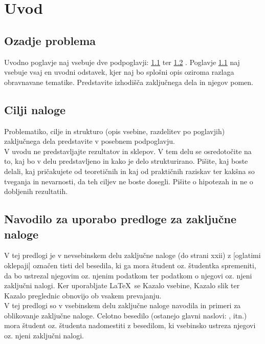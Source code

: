 \chapter{Uvod}\label{cha:uvod}

\section{Ozadje problema}\label{sec:ozadje_problema}
Uvodno poglavje naj vsebuje dve podpoglavji: \ref{sec:ozadje_problema}  ter \ref{sec:cilji_naloge} . Poglavje \ref{sec:ozadje_problema}  naj vsebuje vsaj en uvodni odstavek, kjer naj bo splošni opis oziroma razlaga obravnavane tematike. Predstavite izhodišča zaključnega dela in njegov pomen.


\section{Cilji naloge}\label{sec:cilji_naloge}
Problematiko, cilje in strukturo (opis vsebine, razdelitev po poglavjih) zaključnega dela predstavite v posebnem podpoglavju.\\

V uvodu ne predstavljajte rezultatov in sklepov. V tem delu se osredotočite na to, kaj bo v delu predstavljeno in kako je delo strukturirano. Pišite, kaj boste delali, kaj pričakujete od teoretičnih in kaj od praktičnih raziskav ter kakšna so tveganja in nevarnosti, da teh ciljev ne boste dosegli. Pišite o hipotezah in ne o dobljenih rezultatih.

\section{Navodilo za uporabo predloge za zaključne naloge}\label{sec:uporaba_predloge}
V tej predlogi je v nevsebinskem delu zaključne naloge (do strani xxii) z [oglatimi oklepaji] označen tisti del besedila, ki ga mora študent oz. študentka spremeniti, da bo ustrezal njegovim oz. njenim podatkom ter podatkom o njegovi oz. njeni zaključni nalogi. Ker uporabljate \LaTeX~se Kazalo vsebine, Kazalo slik ter Kazalo preglednic obnovijo ob vsakem prevajanju.\\

V tej predlogi so v vsebinskem delu zaključne naloge navodila in primeri za oblikovanje zaključne naloge. Celotno besedilo (ostanejo glavni naslovi: ,  itn.) mora študent oz. študenta nadomestiti z besedilom, ki vsebinsko ustreza njegovi oz. njeni zaključni nalogi.

